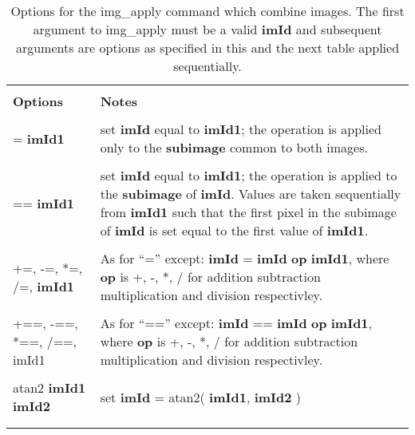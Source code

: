\begin{table}
\begin{tabular}{|l||l|}
\hline
& \\
{\bf Options} & {\bf Notes} \\
& \\ \hline
= {\bf imId1} & 
\begin{minipage}[t]{11.0cm}
set {\bf imId} equal to {\bf imId1}; the operation is applied
only to the {\bf subimage} common to both images.
\end{minipage} \\
& \\
== {\bf imId1} & 
\begin{minipage}[t]{11.0cm}
set {\bf imId} equal to {\bf imId1}; the operation is applied
to the {\bf subimage} of {\bf imId}.  Values are taken sequentially
from {\bf imId1} such that the first pixel in
the subimage of {\bf imId} is set equal to the first value of {\bf imId1}.
\end{minipage} \\
& \\
+=, -=, *=, /=, {\bf imId1} &
\begin{minipage}[t]{11.0cm}
As for ``='' except:
\newline
{\bf imId} = {\bf imId} {\bf op} {\bf imId1}, where {\bf op} is +, -, *, / for
addition subtraction multiplication and division respectivley.
\end{minipage} \\
& \\
+==, -==, *==, /==, imId1 &
\begin{minipage}[t]{11.0cm}
As for ``=='' except:
\newline
{\bf imId} == {\bf imId} {\bf op} {\bf imId1}, where {\bf op} is +, -, *, / for
addition subtraction multiplication and division respectivley.
\end{minipage} \\
& \\
atan2 {\bf imId1} {\bf imId2} & set {\bf imId} = atan2( {\bf imId1}, {\bf imId2} ) \\
& \\
& \\ \hline
\end{tabular}
\caption{Options for the img\_apply command which combine images.  
The first argument to img\_apply must be a valid {\bf imId} and subsequent 
arguments are options as specified in this and the next table applied 
sequentially.}
\end{table}


